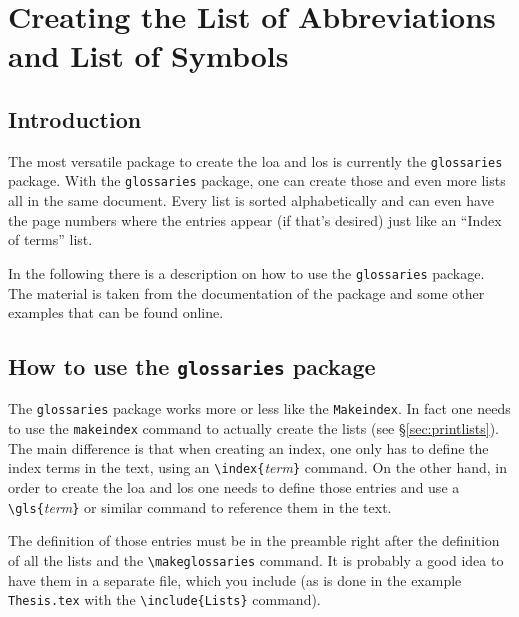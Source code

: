 \chapter{Creating the List of Abbreviations and List of Symbols}\label{chapter5}

\section{Introduction}
The most versatile package to create the \gls{loa} and \gls{los} is currently the \texttt{glossaries} package. With the \texttt{glossaries} package, one can create those and even more lists all in the same document. Every list is sorted alphabetically and can even have the page numbers where the entries appear (if that's desired) just like an ``Index of terms'' list. 

In the following there is a description on how to use the \texttt{glossaries} package. The material is taken from the documentation of the package and some other examples that can be found online.


\section{How to use the \texttt{glossaries} package}\label{sec:howto}
The \texttt{glossaries} package works more or less like the \texttt{Makeindex}. In fact one needs to use the \texttt{makeindex} command to actually create the lists (see \S\ref{sec:printlists}). The main difference is that when creating an index, one only has to define the index terms in the text, using an \texttt{\textbackslash index\{}\textit{term}\texttt{\}} command. On the other hand, in order to create the \gls{loa} and \gls{los} one needs to define those entries and use a \texttt{\textbackslash gls\{}\textit{term}\texttt{\}} or similar command to reference them in the text. 

The definition of those entries must be in the preamble right after the definition of all the lists and the \texttt{\textbackslash makeglossaries} command. It is probably a good idea to have them in a separate file, which you include (as is done in the example \texttt{Thesis.tex} with the \texttt{\textbackslash include\{Lists\}} command). 

